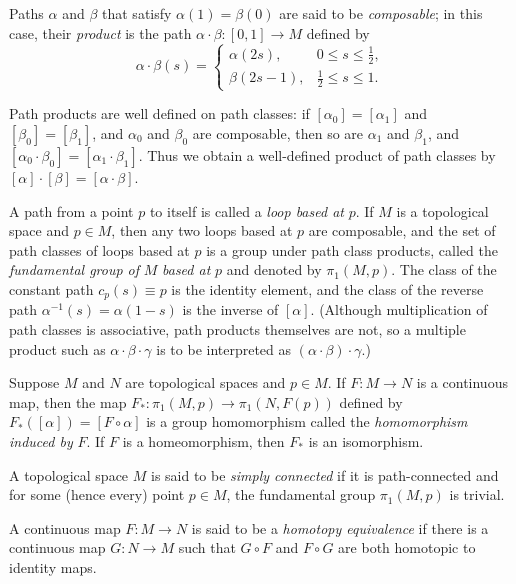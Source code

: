 Paths $\alpha$ and $\beta$ that satisfy $\alpha(1) = \beta(0)$ are said to be \emph{composable}; in this case,
their \emph{product} is the path $\alpha \cdot \beta : [0,1] \to M$ defined by
\[
\alpha \cdot \beta(s) = \begin{cases}
\alpha(2s), & 0 \le s \le \tfrac{1}{2}, \\
\beta(2s-1), & \tfrac{1}{2} \le s \le 1.
\end{cases}
\]

Path products are well defined on path classes: if $[\alpha_0] = [\alpha_1]$ and $[\beta_0] = [\beta_1]$, and
$\alpha_0$ and $\beta_0$ are composable, then so are $\alpha_1$ and $\beta_1$, and $[\alpha_0 \cdot \beta_0] = [\alpha_1 \cdot \beta_1]$. Thus we
obtain a well-defined product of path classes by $[\alpha] \cdot [\beta] = [\alpha \cdot \beta]$.

A path from a point $p$ to itself is called a \emph{loop based at} $p$. If $M$ is a topological
space and $p \in M$, then any two loops based at $p$ are composable, and the set of
path classes of loops based at $p$ is a group under path class products, called the
\emph{fundamental group of} $M$ \emph{based at} $p$ and denoted by $\pi_1(M, p)$. The class of the
constant path $c_p(s) \equiv p$ is the identity element, and the class of the reverse path
$\alpha^{-1}(s) = \alpha(1-s)$ is the inverse of $[\alpha]$. (Although multiplication of path classes is
associative, path products themselves are not, so a multiple product such as $\alpha \cdot \beta \cdot \gamma$
is to be interpreted as $(\alpha \cdot \beta) \cdot \gamma$.)

\begin{proposition}
\label{prop:induced-homomorphisms}

Suppose $M$ and $N$ are topological spaces and $p \in M$. If $F: M \to N$ is a continuous
map, then the map $F_*: \pi_1(M, p) \to \pi_1(N, F(p))$ defined by $F_*([\alpha]) = [F \circ \alpha]$
is a group homomorphism called the \emph{homomorphism induced by} $F$. If $F$ is a homeomorphism, then $F_*$ is an isomorphism.
\end{proposition}

A topological space $M$ is said to be \emph{simply connected} if it is path-connected and
for some (hence every) point $p \in M$, the fundamental group $\pi_1(M, p)$ is trivial.

A continuous map $F: M \to N$ is said to be a \emph{homotopy equivalence} if there is
a continuous map $G: N \to M$ such that $G \circ F$ and $F \circ G$ are both homotopic to
identity maps.

